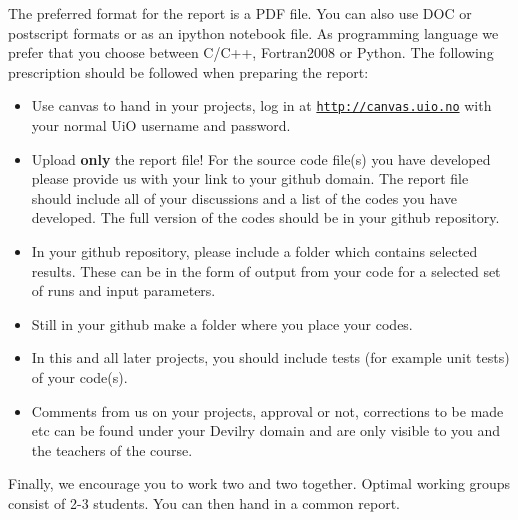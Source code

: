 \documentclass[%
oneside,                 %
final,                   %
10pt]{article}
\begin{document}
The preferred format for the report is a PDF file. You can also use DOC or postscript formats or as an ipython notebook file.  As programming language we prefer that you choose between C/C++, Fortran2008 or Python. The following prescription should be followed when preparing the report:

\begin{itemize}
  \item Use canvas to hand in your projects, log in  at  \href{{http://canvas.uio.no}}{\nolinkurl{http://canvas.uio.no}} with your normal UiO username and password.

  \item Upload \textbf{only} the report file!  For the source code file(s) you have developed please provide us with your link to your github domain.  The report file should include all of your discussions and a list of the codes you have developed.  The full version of the codes should be in your github repository.

  \item In your github repository, please include a folder which contains selected results. These can be in the form of output from your code for a selected set of runs and input parameters.

  \item Still in your github make a folder where you place your codes. 

  \item In this and all later projects, you should include tests (for example unit tests) of your code(s).

  \item Comments  from us on your projects, approval or not, corrections to be made  etc can be found under your Devilry domain and are only visible to you and the teachers of the course.
\end{itemize}

\noindent
Finally, 
we encourage you to work two and two together. Optimal working groups consist of 
2-3 students. You can then hand in a common report. 



\end{document}
